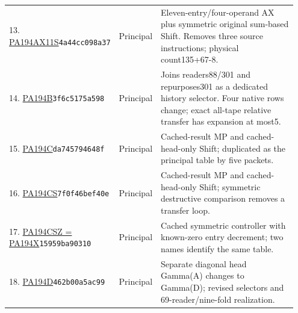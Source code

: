 \begin{longtable}{@{}p{0.27\linewidth}p{0.13\linewidth}p{0.55\linewidth}@{}}
13. \href{https://github.com/VladimirReshetnikov/ProveIt/blob/32d0d8b7d93a63ad4106c18cdb29b37927acdad2/docs/incoming/pa194_ax11s_study.zip}{PA194AX11S}\newline\texttt{4a44cc098a37} & Principal & Eleven-entry/four-operand AX plus symmetric original sum-based Shift. Removes three source instructions; physical count135+67-8.\\[5pt]
14. \href{https://github.com/VladimirReshetnikov/ProveIt/blob/32d0d8b7d93a63ad4106c18cdb29b37927acdad2/Computability/BusyBeaver/Research/PA/docs/PA194B_PA194G_research_2026-11-14/machine/pa194B.tm}{PA194B}\newline\texttt{3f6c5175a598} & Principal & Joins readers88/301 and repurposes301 as a dedicated history selector. Four native rows change; exact all-tape relative transfer has expansion at most5.\\[5pt]
15. \href{https://github.com/VladimirReshetnikov/ProveIt/blob/32d0d8b7d93a63ad4106c18cdb29b37927acdad2/Computability/BusyBeaver/Research/PA/docs/pa194c_conpa_2026-11-13/tables/pa194C.tm}{PA194C}\newline\texttt{da745794648f} & Principal & Cached-result MP and cached-head-only Shift; duplicated as the principal table by five packets.\\[5pt]
16. \href{https://github.com/VladimirReshetnikov/ProveIt/blob/32d0d8b7d93a63ad4106c18cdb29b37927acdad2/Computability/BusyBeaver/Research/PA/docs/pa194_new_designs_2026-11-13/secondary/pa194CS/machine/pa194CS.tm}{PA194CS}\newline\texttt{7f0f46bef40e} & Principal & Cached-result MP and cached-head-only Shift; symmetric destructive comparison removes a transfer loop.\\[5pt]
17. \href{https://github.com/VladimirReshetnikov/ProveIt/blob/32d0d8b7d93a63ad4106c18cdb29b37927acdad2/Computability/BusyBeaver/Research/PA/docs/pa194_radix_family_2026-11-13/search/pa194CSZ/machine/pa194CSZ.tm}{PA194CSZ = PA194X}\newline\texttt{15959ba90310} & Principal & Cached symmetric controller with known-zero entry decrement; two names identify the same table.\\[5pt]
18. \href{https://github.com/VladimirReshetnikov/ProveIt/blob/32d0d8b7d93a63ad4106c18cdb29b37927acdad2/Computability/BusyBeaver/Research/PA/docs/pa194j_pa194d_conpa_2026-11-13/logical_emitter/machine/pa194d.tm}{PA194D}\newline\texttt{462b00a5ac99} & Principal & Separate diagonal head Gamma(A) changes to Gamma(D); revised selectors and 69-reader/nine-fold realization.\\[5pt]

\end{longtable}
